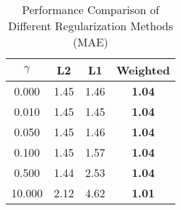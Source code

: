 \begin{table}[htbp]
\centering
\caption{Performance Comparison of Different Regularization Methods (MAE)}
\label{tab:method_comparison}
\begin{tabular}{cccc}
\hline
$\gamma$ & L2 & L1 & Weighted \\
\hline
0.000 & 1.45 & 1.46 & \textbf{1.04} \\
0.010 & 1.45 & 1.45 & \textbf{1.04} \\
0.050 & 1.45 & 1.46 & \textbf{1.04} \\
0.100 & 1.45 & 1.57 & \textbf{1.04} \\
0.500 & 1.44 & 2.53 & \textbf{1.04} \\
10.000 & 2.12 & 4.62 & \textbf{1.01} \\
\hline
\end{tabular}
\end{table}

